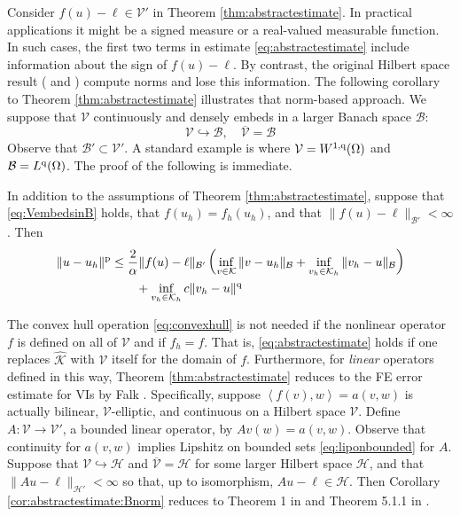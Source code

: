 \documentclass[hidelinks,onefignum,onetabnum,final]{siamart220329}  %
\newcommand{\cB}{\mathcal{B}}
\newcommand{\cH}{\mathcal{H}}
\newcommand{\cK}{\mathcal{K}}
\newcommand{\cV}{\mathcal{V}}
\newcommand{\hcK}{\widehat{\cK}}
\newcommand{\pp}{{\text{\textnormal{p}}}}
\newcommand{\qq}{{\text{\textnormal{q}}}}
\newcommand{\ip}[2]{\left<#1,#2\right>}
\begin{document}
Consider $f(u)-\ell\in \cV'$ in Theorem \ref{thm:abstractestimate}.  In practical applications it might be a signed measure or a real-valued measurable function.  In such cases, the first two terms in estimate \eqref{eq:abstractestimate} include information about the sign of $f(u)-\ell$.  By contrast, the original Hilbert space result (\cite{Falk1974} and \cite[section 5.1]{Ciarlet2002}) compute norms and lose this information.  The following corollary to Theorem \ref{thm:abstractestimate} illustrates that norm-based approach.  We suppose that $\cV$ continuously and densely embeds in a larger Banach space $\cB$:
\begin{equation}
\cV \hookrightarrow \cB, \quad \overline{\cV} = \cB \label{eq:VembedsinB}
\end{equation}
Observe that $\cB' \subset \cV'$.  A standard example is where $\cV=W^{1,\qq}(\Omega)$ and $\cB=L^\qq(\Omega)$.  The proof of the following is immediate.

\begin{corollary}  \label{cor:abstractestimate:Bnorm}  In addition to the assumptions of Theorem \ref{thm:abstractestimate}, suppose that \eqref{eq:VembedsinB} holds, that $f(u_h)=f_h(u_h)$, and that $\|f(u)-\ell\|_{\cB'} < \infty$.  Then
\begin{align}
\|u-u_h\|^\pp &\le \frac{2}{\alpha} \|f(u)-\ell\|_{\cB'} \left( \inf_{v\in\cK} \|v-u_h\|_{\cB} +   \inf_{v_h\in\cK_h} \|v_h-u\|_{\cB} \right) \label{eq:abstractestimate:Bnorm} \\
   &\qquad + \inf_{v_h\in\cK_h} c \|v_h - u\|^\qq \notag
\end{align}
\end{corollary}

The convex hull operation \eqref{eq:convexhull} is not needed if the nonlinear operator $f$ is defined on all of $\cV$ and if $f_h=f$.  That is, \eqref{eq:abstractestimate} holds if one replaces $\hcK$ with $\cV$ itself for the domain of $f$.  Furthermore, for \emph{linear} operators defined in this way, Theorem \ref{thm:abstractestimate} reduces to the FE error estimate for VIs by Falk \cite{Falk1974}.  Specifically, suppose $\ip{f(v)}{w}=a(v,w)$ is actually bilinear, $\cV$-elliptic, and continuous on a Hilbert space $\cV$.  Define $A:\cV\to\cV'$, a bounded linear operator, by $Av(w) = a(v,w)$.  Observe that continuity for $a(v,w)$ implies Lipshitz on bounded sets \eqref{eq:liponbounded} for $A$.  Suppose that $\cV\hookrightarrow \cH$ and $\overline{\cV} = \cH$ for some larger Hilbert space $\cH$, and that $\|Au-\ell\|_{\cH'} < \infty$ so that, up to isomorphism, $Au-\ell \in \cH$.  Then Corollary \ref{cor:abstractestimate:Bnorm} reduces to Theorem 1 in \cite{Falk1974} and Theorem 5.1.1 in \cite{Ciarlet2002}.
\end{document}
